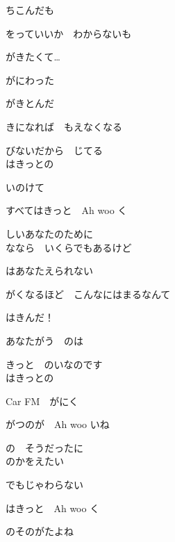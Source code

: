 \large{

ちこんだも

をっていいか　わからないも

がきたくて…

がにわった

がきとんだ

きになれば　もえなくなる

びないだから　じてる
\\

はきっとの

いのけて

すべてはきっと　Ah woo く

しいあなたのために
\\

ななら　いくらでもあるけど

はあなたえられない

がくなるほど　こんなにはまるなんて

はきんだ！

あなたがう　のは

きっと　のいなのです
\\

はきっとの

Car FM　がにく

がつのが　Ah woo いね

の　そうだったに
\\

のかをえたい

でもじゃわらない

はきっと　Ah woo く

のそのがたよね

}